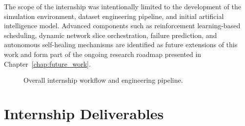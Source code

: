 \documentclass[12pt,a4paper]{report}
\begin{document}
	The scope of the internship was intentionally limited to the development of the simulation environment, dataset engineering pipeline, and initial artificial intelligence model. Advanced components such as reinforcement learning-based scheduling, dynamic network slice orchestration, failure prediction, and autonomous self-healing mechanisms are identified as future extensions of this work and form part of the ongoing research roadmap presented in Chapter~\ref{chap:future_work}.
	
	
	
	\begin{figure}[H]
		\centering
		\fbox{\rule{0pt}{3in}\rule{0.85\textwidth}{0pt}}
		\caption{Overall internship workflow and engineering pipeline.}
		\label{fig:overall_workflow}
	\end{figure}
	
	\section{Internship Deliverables}
	\label{sec:deliverables}
	
	
\end{document}
